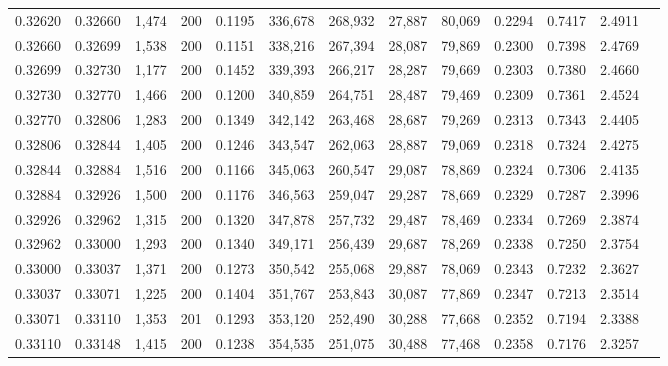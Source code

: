 \begin{tabular}{rrrrrrrrrrrrr}
0.32620 & 0.32660 & 1,474 & 200 &                                     0.1195 & 336,678 & 268,932 &  27,887 &  80,069 & 0.2294 & 0.7417 & 2.4911 \\
0.32660 & 0.32699 & 1,538 & 200 &                                     0.1151 & 338,216 & 267,394 &  28,087 &  79,869 & 0.2300 & 0.7398 & 2.4769 \\
0.32699 & 0.32730 & 1,177 & 200 &                                     0.1452 & 339,393 & 266,217 &  28,287 &  79,669 & 0.2303 & 0.7380 & 2.4660 \\
0.32730 & 0.32770 & 1,466 & 200 &                                     0.1200 & 340,859 & 264,751 &  28,487 &  79,469 & 0.2309 & 0.7361 & 2.4524 \\
0.32770 & 0.32806 & 1,283 & 200 &                                     0.1349 & 342,142 & 263,468 &  28,687 &  79,269 & 0.2313 & 0.7343 & 2.4405 \\
0.32806 & 0.32844 & 1,405 & 200 &                                     0.1246 & 343,547 & 262,063 &  28,887 &  79,069 & 0.2318 & 0.7324 & 2.4275 \\
0.32844 & 0.32884 & 1,516 & 200 &                                     0.1166 & 345,063 & 260,547 &  29,087 &  78,869 & 0.2324 & 0.7306 & 2.4135 \\
0.32884 & 0.32926 & 1,500 & 200 &                                     0.1176 & 346,563 & 259,047 &  29,287 &  78,669 & 0.2329 & 0.7287 & 2.3996 \\
0.32926 & 0.32962 & 1,315 & 200 &                                     0.1320 & 347,878 & 257,732 &  29,487 &  78,469 & 0.2334 & 0.7269 & 2.3874 \\
0.32962 & 0.33000 & 1,293 & 200 &                                     0.1340 & 349,171 & 256,439 &  29,687 &  78,269 & 0.2338 & 0.7250 & 2.3754 \\
0.33000 & 0.33037 & 1,371 & 200 &                                     0.1273 & 350,542 & 255,068 &  29,887 &  78,069 & 0.2343 & 0.7232 & 2.3627 \\
0.33037 & 0.33071 & 1,225 & 200 &                                     0.1404 & 351,767 & 253,843 &  30,087 &  77,869 & 0.2347 & 0.7213 & 2.3514 \\
0.33071 & 0.33110 & 1,353 & 201 &                                     0.1293 & 353,120 & 252,490 &  30,288 &  77,668 & 0.2352 & 0.7194 & 2.3388 \\
0.33110 & 0.33148 & 1,415 & 200 &                                     0.1238 & 354,535 & 251,075 &  30,488 &  77,468 & 0.2358 & 0.7176 & 2.3257 \\

\end{tabular}
